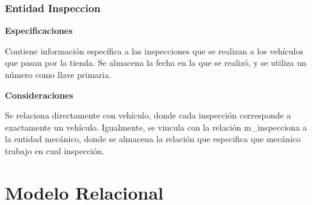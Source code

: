 \documentclass[12pt]{article}
\begin{document}
\subsubsection{Entidad Inspeccion}
\textbf{Especificaciones}

Contiene información específica a las inspecciones que se realizan a los vehículos que pasan por la tienda. Se almacena la fecha en la que se realizó, y se utiliza un número como llave primaria.

\textbf{Consideraciones}

Se relaciona directamente con vehículo, donde cada inspección corresponde a exactamente un vehículo. Igualmente, se vincula con la relación m\_inspecciona a la entidad mecánico, donde se almacena la relación que especifica que mecánico trabajo en cual inspección.

\section{Modelo Relacional}
\end{document}
